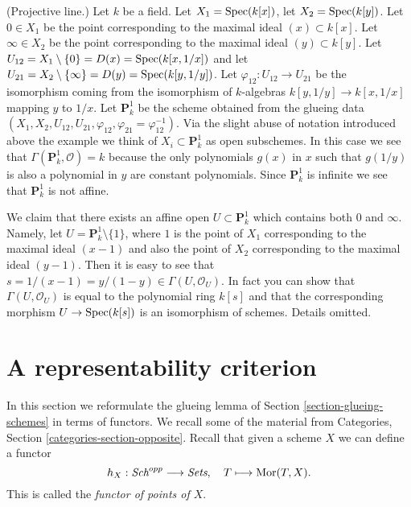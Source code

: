 \begin{example}
\label{example-projective-line}
(Projective line.)
Let $k$ be a field.
Let $X_1 = \mathop{\rm Spec}(k[x])$,
let $X_2 = \mathop{\rm Spec}(k[y])$.
Let $0 \in X_1$ be the point corresponding to the maximal ideal
$(x) \subset k[x]$.
Let $\infty \in X_2$ be the point corresponding to the maximal ideal
$(y) \subset k[y]$.
Let $U_{12} = X_1 \setminus \{0\} = D(x) = \mathop{\rm Spec}(k[x, 1/x])$ and
let $U_{21} = X_2 \setminus \{\infty\} = D(y) = \mathop{\rm Spec}(k[y, 1/y])$.
Let $\varphi_{12} : U_{12} \to U_{21}$ be the isomorphism
coming from the isomorphism of $k$-algebras
$k[y, 1/y] \to k[x, 1/x]$ mapping $y$ to $1/x$.
Let $\mathbf{P}^1_k$ be the scheme obtained from the glueing data
$(X_1, X_2, U_{12}, U_{21}, \varphi_{12},
\varphi_{21} = \varphi_{12}^{-1})$. Via the slight abuse
of notation introduced above the example we think of
$X_i \subset \mathbf{P}^1_k$ as open subschemes. In this case
we see that $\Gamma(\mathbf{P}^1_k, \mathcal{O}) = k$ because the
only polynomials $g(x)$ in $x$ such that $g(1/y)$ is
also a polynomial in $y$ are constant polynomials.
Since $\mathbf{P}^1_k$ is infinite we see that $\mathbf{P}^1_k$ is not affine.

\medskip\noindent
We claim that there exists an affine open $U \subset \mathbf{P}^1_k$
which contains both $0$ and $\infty$. Namely, let
$U = \mathbf{P}^1_k \setminus \{1\}$, where $1$ is the point
of $X_1$ corresponding to the maximal ideal $(x - 1)$
and also the point of $X_2$ corresponding to the
maximal ideal $(y - 1)$. Then it is easy to see that
$s = 1/(x - 1) = y/(1 - y) \in \Gamma(U, \mathcal{O}_U)$.
In fact you can show that $\Gamma(U, \mathcal{O}_U)$
is equal to the polynomial ring $k[s]$ and that the
corresponding morphism $U \to \mathop{\rm Spec}(k[s])$ is
an isomorphism of schemes. Details omitted.
\end{example}




\section{A representability criterion}
\label{section-representable}

\noindent
In this section we reformulate the glueing lemma
of Section \ref{section-glueing-schemes} in terms
of functors. We recall some of the material from
Categories, Section \ref{categories-section-opposite}.
Recall that given a scheme $X$ we
can define a functor
$$
h_X : \textit{Sch}^{opp}
\longrightarrow
\textit{Sets}, \quad
T \longmapsto \mathop{\rm Mor}\nolimits(T, X).
$$
This is called the {\it functor of points of $X$}.

